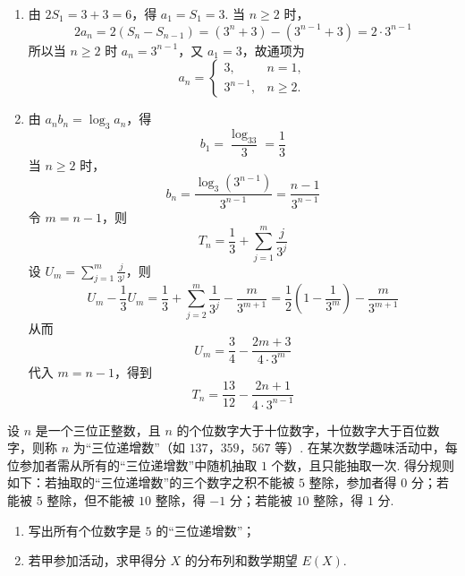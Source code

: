 \begin{solution}
\begin{enumerate}
\item 由 \(2S_1=3+3=6\)，得 \(a_1=S_1=3\). 当 \(n\geqslant2\) 时，
\[
2a_n=2(S_n-S_{n-1})
=(3^n+3)-(3^{n-1}+3)=2\cdot3^{n-1}
\]
所以当 \(n\geqslant2\) 时 \(a_n=3^{n-1}\)，又 \(a_1=3\)，故通项为
\[
a_n=\begin{cases}
3, & n=1,\\
3^{n-1}, & n\geqslant2.
\end{cases}
\]
\item 由 \(a_nb_n=\log_3a_n\)，得
\[
b_1=\frac{\log_33}{3}=\frac13
\]
当 \(n\geqslant2\) 时，
\[
b_n=\frac{\log_3(3^{n-1})}{3^{n-1}}=\frac{n-1}{3^{n-1}}
\]
令 \(m=n-1\)，则
\[
T_n=\frac13+\sum_{j=1}^{m}\frac j{3^j}
\]
设 \(U_m=\sum_{j=1}^{m}\frac j{3^j}\)，则
\[
U_m-\frac13U_m
=\frac13+\sum_{j=2}^{m}\frac1{3^j}-\frac{m}{3^{m+1}}
=\frac12\left(1-\frac1{3^m}\right)-\frac{m}{3^{m+1}}
\]
从而
\[
U_m=\frac34-\frac{2m+3}{4\cdot3^m}
\]
代入 \(m=n-1\)，得到
\[
T_n=\frac{13}{12}-\frac{2n+1}{4\cdot3^{n-1}}
\]
\end{enumerate}
\end{solution}

\begin{problem}
设 \(n\) 是一个三位正整数，且 \(n\) 的个位数字大于十位数字，十位数字大于百位数字，则称 \(n\) 为“三位递增数”（如 \(137\)，\(359\)，\(567\) 等）. 在某次数学趣味活动中，每位参加者需从所有的“三位递增数”中随机抽取 \(1\) 个数，且只能抽取一次. 得分规则如下：若抽取的“三位递增数”的三个数字之积不能被 \(5\) 整除，参加者得 \(0\) 分；若能被 \(5\) 整除，但不能被 \(10\) 整除，得 \(-1\) 分；若能被 \(10\) 整除，得 \(1\) 分.
\begin{enumerate}
\item 写出所有个位数字是 \(5\) 的“三位递增数”；
\item 若甲参加活动，求甲得分 \(X\) 的分布列和数学期望 \(E(X)\).
\end{enumerate}
\end{problem}

